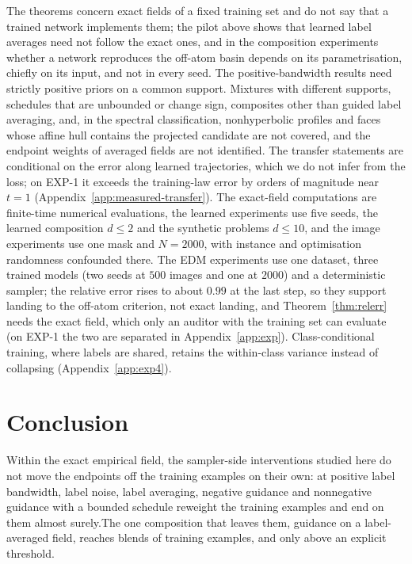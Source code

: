 \documentclass{article} %
\newif\ificlr
\theoremstyle{plain}
\theoremstyle{definition}
\theoremstyle{remark}
\begin{document}
The theorems concern exact fields of a fixed training set and do not say that a trained network
implements them; the\ificlr{} label-averaging pilot of Appendix~\ref{app:intervention-protocol}\else{} pilot above\fi{} shows that learned label averages need not follow the exact
ones, and in the composition experiments whether a network reproduces the off-atom basin
depends on its parametrisation, chiefly on its input, and not in every seed. The positive-bandwidth results need strictly positive priors on a common support. Mixtures
with different supports, schedules that are unbounded or change sign, composites other than
guided label averaging, and, in the spectral classification, nonhyperbolic profiles and faces
whose affine hull contains the projected candidate are not covered,
and the endpoint weights of averaged fields are not identified. The transfer statements are
conditional on the error along learned trajectories, which we do not infer from the loss\ificlr{}
(Appendix~\ref{app:measured-transfer})\else; on
EXP-1 it exceeds the training-law error by orders of magnitude near $t=1$
(Appendix~\ref{app:measured-transfer})\fi. The exact-field computations are finite-time numerical evaluations, the
learned experiments use five seeds, the learned composition $d\le2$ and the synthetic
problems $d\le10$, and the image
experiments use one mask and $N{=}2000$, with instance and optimisation randomness confounded
there. The EDM experiments use one dataset, three trained models (two seeds at $500$ images and one
at $2000$) and a deterministic sampler; the relative error rises to about $0.99$ at the last step,
so they support landing to the off-atom criterion, not exact landing, and Theorem~\ref{thm:relerr}
needs the exact field, which only an auditor with the training set can evaluate\ificlr.\else{} (on EXP-1 the two are separated in Appendix~\ref{app:exp}). Class-conditional training, where labels are shared, retains the
within-class variance instead of collapsing (Appendix~\ref{app:exp4}).\fi

\section{Conclusion}
\label{sec:conclusion}

Within the exact empirical field, the sampler-side interventions studied here do not move the
endpoints off the training examples on their own:\ificlr{} at positive label bandwidth they reweight
the training examples and end on them almost surely.\else{} at positive label bandwidth, label noise, label averaging, negative guidance
and nonnegative guidance with a bounded schedule reweight the training examples and end on them
almost surely.\fi The one composition that leaves them, guidance on a label-averaged field, reaches
blends of training examples, and only above an explicit threshold.
\end{document}
